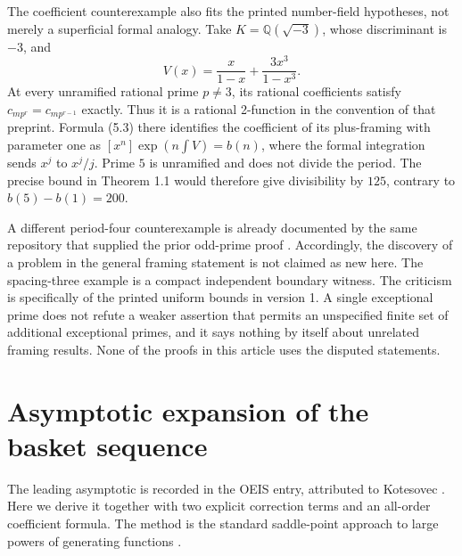 \documentclass[11pt,a4paper]{article}
\numberwithin{equation}{section}
\theoremstyle{definition}
\theoremstyle{remark}
\newcommand{\Q}{\mathbb Q}
\begin{document}
The coefficient counterexample also fits the printed number-field
hypotheses, not merely a superficial formal analogy. Take
$K=\Q(\sqrt{-3})$, whose discriminant is $-3$, and
\[
 V(x)=\frac{x}{1-x}+\frac{3x^3}{1-x^3}.
\]
At every unramified rational prime $p\ne3$, its rational coefficients
satisfy $c_{mp^r}=c_{mp^{r-1}}$ exactly. Thus it is a rational 2-function
in the convention of that preprint. Formula (5.3) there identifies the
coefficient of its plus-framing with parameter one as
$[x^n]\exp(n\int V)=b(n)$, where the formal integration sends $x^j$ to
$x^j/j$. Prime $5$ is unramified and does not divide the period. The
precise bound in Theorem 1.1 would therefore give divisibility by $125$,
contrary to $b(5)-b(1)=200$.

A different period-four counterexample is already documented by the same
repository that supplied the prior odd-prime proof \cite{priorcounter}.
Accordingly, the discovery of a problem in the general framing statement is
not claimed as new here. The spacing-three example is a compact independent
boundary witness. The criticism is specifically of the printed uniform
bounds in version 1. A single exceptional prime does not refute a weaker
assertion that permits an unspecified finite set of additional exceptional
primes, and it says nothing by itself about unrelated framing results.
None of the proofs in this article uses the disputed statements.

\section{Asymptotic expansion of the basket sequence}
\label{sec:asymptotic}

The leading asymptotic is recorded in the OEIS entry, attributed to
Kotesovec \cite{oeis348410}. Here we derive it together with two explicit
correction terms and an all-order coefficient formula. The method is the
standard saddle-point approach to large powers of generating functions
\cite[Chapter VIII]{flajolet}.
\end{document}
